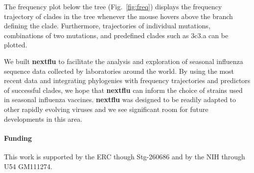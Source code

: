\documentclass{bioinfo}
\newcommand{\FIG}[1]{Fig.~\ref{fig:#1}}
\newcommand{\nextflu}{\textbf{nextflu}}
\begin{document}
The frequency plot below the tree (\FIG{freq}) displays the frequency trajectory of clades in the tree whenever the mouse hovers above the branch defining the clade. 
Furthermore, trajectories of individual mutations, combinations of two mutations, and predefined clades such as 3c3.a can be plotted.

We built \nextflu{} to facilitate the analysis and exploration of seasonal influenza sequence data collected by laboratories around the world.
By using the most recent data and integrating phylogenies with frequency trajectories and predictors of successful clades, we hope that \nextflu{} can inform the choice of strains used in seasonal influenza vaccines. 
\nextflu{} was designed to be readily adapted to other rapidly evolving viruses and we see significant room for future developments in this area.
 
\paragraph{Funding\textcolon}This work is supported by the ERC though Stg-260686 and by the NIH through U54 GM111274.
\end{document}

